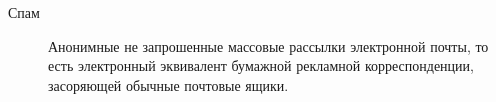 \Defines %
\begin{description}
\item[Спам] Анонимные не запрошенные массовые рассылки электронной почты, то есть электронный эквивалент бумажной рекламной корреспонденции, засоряющей обычные почтовые ящики.
\end{description}


